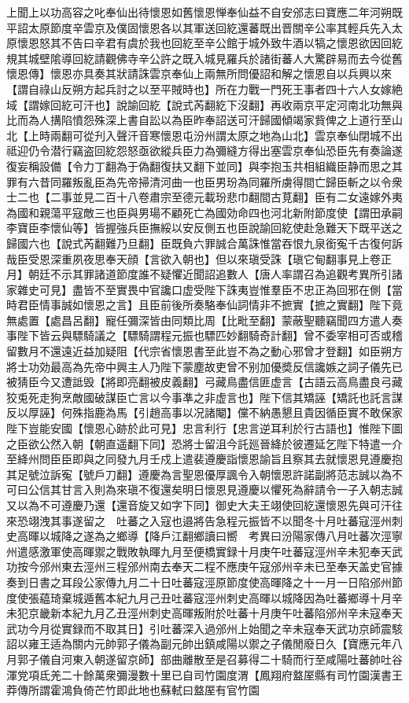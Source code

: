 上聞上以功高容之叱奉仙出待懷恩如舊懷恩惮奉仙益不自安邠志曰寶應二年河朔既平詔太原節度辛雲京及僕固懷恩各以其軍送回紇還蕃既出晋關辛公率其輕兵先入太原懷恩怒其不告曰辛君有虞於我也回紇至辛公館于城外致牛酒以犒之懷恩欲因回紇規其城壁隂導回紇請觀佛寺辛公許之既入城見羅兵於諸街蕃人大驚辟易而去今從舊懷恩傳】懷恩亦具奏其狀請誅雲京奉仙上兩無所問優詔和解之懷恩自以兵興以來【謂自祿山反朔方起兵討之以至平賊時也】所在力戰一門死王事者四十六人女嫁絶域【謂嫁回紇可汗也】說諭回紇【說式芮翻紇下沒翻】再收兩京平定河南北功無與比而為人搆陷憤怨殊深上書自訟以為臣昨奉詔送可汗歸國傾竭家貲俾之上道行至山北【上時兩翻可從刋入聲汗音寒懷恩屯汾州謂太原之地為山北】雲京奉仙閉城不出祗迎仍令潜行竊盗回紇怨怒亟欲縱兵臣力為彌縫方得出塞雲京奉仙恐臣先有奏論遂復妄稱設備【令力丁翻為于偽翻復扶又翻下並同】與李抱玉共相組織臣静而思之其罪有六昔同羅叛亂臣為先帝掃清河曲一也臣男玢為同羅所虜得間亡歸臣斬之以令衆士二也【二事並見二百十八卷肅宗至德元載玢悲巾翻間古莧翻】臣有二女遠嫁外夷為國和親蕩平寇敵三也臣與男瑒不顧死亡為國効命四也河北新附節度使【謂田承嗣李寶臣李懷仙等】皆握強兵臣撫綏以安反側五也臣說諭回紇使赴急難天下既平送之歸國六也【說式芮翻難乃旦翻】臣既負六罪誠合萬誅惟當吞恨九泉銜寃千古復何訴哉臣受恩深重夙夜思奉天顔【言欲入朝也】但以來瑱受誅【瑱它甸翻事見上卷正月】朝廷不示其罪諸道節度誰不疑懼近聞詔追數人【唐人率謂召為追觀考異所引諸家雜史可見】盡皆不至實畏中官讒口虚受陛下誅夷豈惟羣臣不忠正為回邪在側【當時君臣情事誠如懷恩之言】且臣前後所奏駱奉仙詞情非不摭實【摭之實翻】陛下竟無處置【處昌呂翻】寵任彌深皆由同類比周【比毗至翻】蒙蔽聖聽竊聞四方遣人奏事陛下皆云與驃騎議之【驃騎謂程元振也驃匹妙翻騎奇計翻】曾不委宰相可否或稽留數月不還遠近益加疑阻【代宗省懷恩書至此豈不為之動心邪曾才登翻】如臣朔方將士功効最高為先帝中興主人乃陛下蒙塵故吏曾不别加優奬反信讒嫉之詞子儀先已被猜臣今又遭詆毁【將即亮翻被皮義翻】弓藏鳥盡信匪虚言【古語云高鳥盡良弓藏狡兎死走狗烹敵國破謀臣亡言以今事凖之非虚言也】陛下信其矯誣【矯託也託言謀反以厚誣】何殊指鹿為馬【引趙高事以况諸閹】儻不納愚懇且貴因循臣實不敢保家陛下豈能安國【懷恩心跡於此可見】忠言利行【忠言逆耳利於行古語也】惟陛下圖之臣欲公然入朝【朝直遥翻下同】恐將士留沮今託廵晉絳於彼遷延乞陛下特遣一介至絳州問臣臣即與之同發九月壬戍上遣裴遵慶詣懷恩諭旨且察其去就懷恩見遵慶抱其足號泣訴寃【號戶刀翻】遵慶為言聖恩優厚諷令入朝懷恩許諾副將范志誠以為不可曰公信其甘言入則為來瑱不復還矣明日懷恩見遵慶以懼死為辭請令一子入朝志誠又以為不可遵慶乃還【還音旋又如字下同】御史大夫王翊使回紇還懷恩先與可汗往來恐翊洩其事遂留之　吐蕃之入寇也邉將告急程元振皆不以聞冬十月吐蕃寇涇州刺史高暉以城降之遂為之鄉導【降戶江翻鄉讀曰嚮　考異曰汾陽家傳八月吐蕃次涇寧州遣感激軍使高暉禦之戰敗執暉九月至便橋實録十月庚午吐蕃寇涇州辛未犯奉天武功按今邠州東去涇州三程邠州南去奉天二程不應庚午寇邠州辛未已至奉天盖史官據奏到日書之耳段公家傳九月二十日吐蕃寇涇原節度使高暉降之十一月一日陷邠州節度使張藴琦棄城遁舊本紀九月己丑吐蕃寇涇州刺史高暉以城降因為吐蕃鄉導十月辛未犯京畿新本紀九月乙丑涇州刺史高暉叛附於吐蕃十月庚午吐蕃陷邠州辛未寇奉天武功今月從實録而不取其日】引吐蕃深入過邠州上始聞之辛未寇奉天武功京師震駭詔以雍王适為關内元帥郭子儀為副元帥出鎮咸陽以禦之子儀閒廢日久【寶應元年八月郭子儀自河東入朝遂留京師】部曲離散至是召募得二十騎而行至咸陽吐蕃帥吐谷渾党項氐羌二十餘萬衆彌漫數十里已自司竹園度渭【鳳翔府盩厔縣有司竹園漢書王莽傳所謂霍鴻負倚芒竹即此地也蘇軾曰盩厔有官竹園